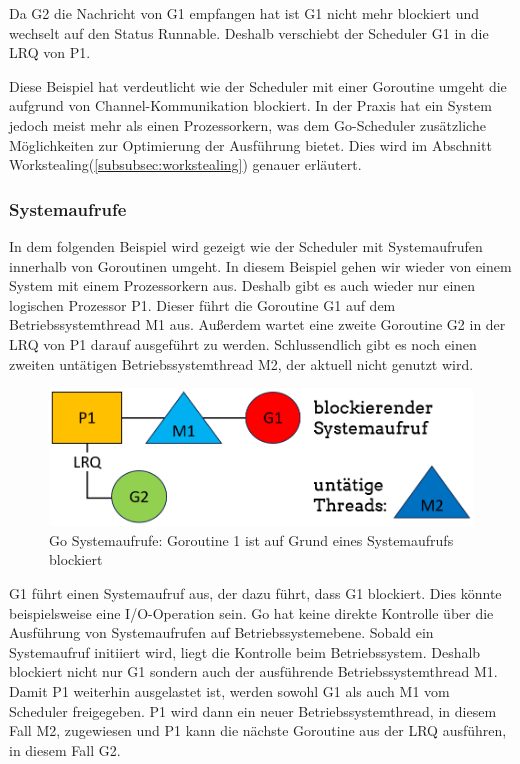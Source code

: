 \documentclass[fontsize=12pt,paper=a4,twoside=semi,parskip=half-,headsepline,headinclude]{scrreprt}
\begin{document}
Da G2 die Nachricht von G1 empfangen hat ist G1 nicht mehr blockiert und wechselt auf den Status Runnable. Deshalb verschiebt der Scheduler G1 in die LRQ von P1.

Diese Beispiel hat verdeutlicht wie der Scheduler mit einer Goroutine umgeht die aufgrund von Channel-Kommunikation blockiert. In der Praxis hat ein System jedoch meist mehr als einen Prozessorkern, was dem Go-Scheduler zusätzliche Möglichkeiten zur Optimierung der Ausführung bietet. Dies wird im Abschnitt Workstealing(\ref{subsubsec:workstealing}) genauer erläutert.

\subsubsection{Systemaufrufe}

In dem folgenden Beispiel wird gezeigt wie der Scheduler mit Systemaufrufen innerhalb von Goroutinen umgeht. In diesem Beispiel gehen wir wieder von einem System mit einem Prozessorkern aus. Deshalb gibt es auch wieder nur einen logischen Prozessor P1. Dieser führt die Goroutine G1 auf dem Betriebssystemthread M1 aus. Außerdem wartet eine zweite Goroutine G2 in der LRQ von P1 darauf ausgeführt zu werden. Schlussendlich gibt es noch einen zweiten untätigen Betriebssystemthread M2, der aktuell nicht genutzt wird.

\begin{figure}[H]
	\centering
	\includegraphics[scale=0.5]{figures/GoroutineSystemaufrufe1.png}
	\caption{Go Systemaufrufe: Goroutine 1 ist auf Grund eines Systemaufrufs blockiert}
	\label{fig:GoroutineSystemaufrufe1}
\end{figure}

G1 führt einen Systemaufruf aus, der dazu führt, dass G1 blockiert. Dies könnte beispielsweise eine I/O-Operation sein. Go hat keine direkte Kontrolle über die Ausführung von Systemaufrufen auf Betriebssystemebene. Sobald ein Systemaufruf initiiert wird, liegt die Kontrolle beim Betriebssystem. Deshalb blockiert nicht nur G1 sondern auch der ausführende Betriebssystemthread M1. Damit P1 weiterhin ausgelastet ist, werden sowohl G1 als auch M1 vom Scheduler freigegeben. P1 wird dann ein neuer Betriebssystemthread, in diesem Fall M2, zugewiesen und P1 kann die nächste Goroutine aus der LRQ ausführen, in diesem Fall G2.
\end{document}

